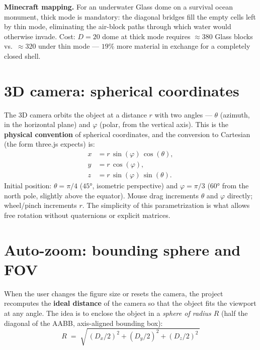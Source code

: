 \documentclass[12pt,a4paper]{scrartcl}
\newcommand{\acc}[1]{\textcolor{accent}{\textbf{#1}}}
\begin{document}
\begin{minec}
\textbf{Minecraft mapping.} For an underwater Glass dome on a survival ocean monument, thick mode is mandatory: the diagonal bridges fill the empty cells left by thin mode, eliminating the air-block paths through which water would otherwise invade. Cost: $D=20$ dome at thick mode requires $\approx 380$ Glass blocks vs.\ $\approx 320$ under thin mode --- $19\%$ more material in exchange for a completely closed shell.
\end{minec}

\section{3D camera: spherical coordinates}

The 3D camera orbits the object at a distance $r$ with two angles --- $\theta$ (azimuth, in the horizontal plane) and $\varphi$ (polar, from the vertical axis). This is the \acc{physical convention} of spherical coordinates, and the conversion to Cartesian (the form three.js expects) is:
\[
\begin{aligned}
x &= r\,\sin(\varphi)\,\cos(\theta), \\
y &= r\,\cos(\varphi), \\
z &= r\,\sin(\varphi)\,\sin(\theta).
\end{aligned}
\]
Initial position: $\theta = \pi/4$ ($45°$, isometric perspective) and $\varphi = \pi/3$ ($60°$ from the north pole, slightly above the equator). Mouse drag increments $\theta$ and $\varphi$ directly; wheel/pinch increments $r$. The simplicity of this parametrization is what allows free rotation without quaternions or explicit matrices.

\section{Auto-zoom: bounding sphere and FOV}

When the user changes the figure size or resets the camera, the project recomputes the \acc{ideal distance} of the camera so that the object fits the viewport at any angle. The idea is to enclose the object in a \emph{sphere of radius $R$} (half the diagonal of the AABB, axis-aligned bounding box):
\[
R \;=\; \sqrt{\,(D_x/2)^2 + (D_y/2)^2 + (D_z/2)^2\,}
\]
\end{document}
